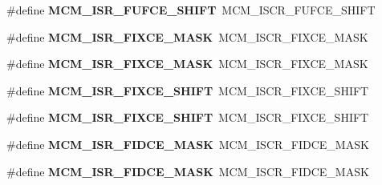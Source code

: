 \begin{DoxyCompactItemize}
\item 
\#define {\bfseries M\+C\+M\+\_\+\+I\+S\+R\+\_\+\+F\+U\+F\+C\+E\+\_\+\+S\+H\+I\+FT}~M\+C\+M\+\_\+\+I\+S\+C\+R\+\_\+\+F\+U\+F\+C\+E\+\_\+\+S\+H\+I\+FT\hypertarget{group__Backward__Compatibility__Symbols_ga6dedcd01f8354cf840e86447f16977bc}{}\label{group__Backward__Compatibility__Symbols_ga6dedcd01f8354cf840e86447f16977bc}

\item 
\#define {\bfseries M\+C\+M\+\_\+\+I\+S\+R\+\_\+\+F\+I\+X\+C\+E\+\_\+\+M\+A\+SK}~M\+C\+M\+\_\+\+I\+S\+C\+R\+\_\+\+F\+I\+X\+C\+E\+\_\+\+M\+A\+SK\hypertarget{group__Backward__Compatibility__Symbols_ga91bb2a831a64c0915a1f7e798aaf1b3c}{}\label{group__Backward__Compatibility__Symbols_ga91bb2a831a64c0915a1f7e798aaf1b3c}

\item 
\#define {\bfseries M\+C\+M\+\_\+\+I\+S\+R\+\_\+\+F\+I\+X\+C\+E\+\_\+\+M\+A\+SK}~M\+C\+M\+\_\+\+I\+S\+C\+R\+\_\+\+F\+I\+X\+C\+E\+\_\+\+M\+A\+SK\hypertarget{group__Backward__Compatibility__Symbols_ga91bb2a831a64c0915a1f7e798aaf1b3c}{}\label{group__Backward__Compatibility__Symbols_ga91bb2a831a64c0915a1f7e798aaf1b3c}

\item 
\#define {\bfseries M\+C\+M\+\_\+\+I\+S\+R\+\_\+\+F\+I\+X\+C\+E\+\_\+\+S\+H\+I\+FT}~M\+C\+M\+\_\+\+I\+S\+C\+R\+\_\+\+F\+I\+X\+C\+E\+\_\+\+S\+H\+I\+FT\hypertarget{group__Backward__Compatibility__Symbols_ga77e3807fb3be264bbbcf2c8f788935e1}{}\label{group__Backward__Compatibility__Symbols_ga77e3807fb3be264bbbcf2c8f788935e1}

\item 
\#define {\bfseries M\+C\+M\+\_\+\+I\+S\+R\+\_\+\+F\+I\+X\+C\+E\+\_\+\+S\+H\+I\+FT}~M\+C\+M\+\_\+\+I\+S\+C\+R\+\_\+\+F\+I\+X\+C\+E\+\_\+\+S\+H\+I\+FT\hypertarget{group__Backward__Compatibility__Symbols_ga77e3807fb3be264bbbcf2c8f788935e1}{}\label{group__Backward__Compatibility__Symbols_ga77e3807fb3be264bbbcf2c8f788935e1}

\item 
\#define {\bfseries M\+C\+M\+\_\+\+I\+S\+R\+\_\+\+F\+I\+D\+C\+E\+\_\+\+M\+A\+SK}~M\+C\+M\+\_\+\+I\+S\+C\+R\+\_\+\+F\+I\+D\+C\+E\+\_\+\+M\+A\+SK\hypertarget{group__Backward__Compatibility__Symbols_ga4780723525e85d00fded39af33239306}{}\label{group__Backward__Compatibility__Symbols_ga4780723525e85d00fded39af33239306}

\item 
\#define {\bfseries M\+C\+M\+\_\+\+I\+S\+R\+\_\+\+F\+I\+D\+C\+E\+\_\+\+M\+A\+SK}~M\+C\+M\+\_\+\+I\+S\+C\+R\+\_\+\+F\+I\+D\+C\+E\+\_\+\+M\+A\+SK\hypertarget{group__Backward__Compatibility__Symbols_ga4780723525e85d00fded39af33239306}{}\label{group__Backward__Compatibility__Symbols_ga4780723525e85d00fded39af33239306}


\end{DoxyCompactItemize}
